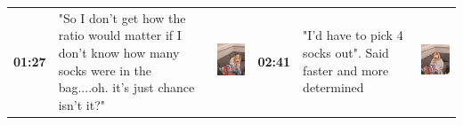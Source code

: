 \documentclass[twocolumn, issue, empirical, authordate,drafn]{jote-new-article}
\begin{document}
\begin{table}[ht!]
\begin{fullwidth}
\begin{tabularx}{\linewidth}{@{} m{.05\linewidth} m{.28\linewidth} >{\raggedleft\arraybackslash}m{.1\linewidth}  m{.05\linewidth} m{.28\linewidth} >{\raggedleft\arraybackslash}m{.1\linewidth} @{}}
\textbf{01:27} & "So I don't get how the ratio would matter if I don't know how many socks were in the bag....oh. it's just chance isn't it?" & \includegraphics[height=.09\textheight, valign=t]{media/image17.png} &
 \textbf{02:41} & "I'd have to pick 4 socks out". Said faster and more determined & \includegraphics[height=.09\textheight, valign=t]{media/image25.png} \\ 
 

\end{tabularx}
\end{fullwidth}
\end{table}
\end{document}
